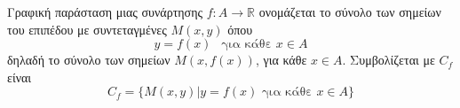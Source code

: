 Γραφική παράσταση μιας συνάρτησης $ f:A\rightarrow\mathbb{R} $ ονομάζεται το σύνολο των σημείων του επιπέδου με συντεταγμένες $ M(x,y) $ όπου \[ y=f(x)\ \ \text{ για κάθε }x\in A \]
δηλαδή το σύνολο των σημείων $ M(x,f(x)) $, για κάθε $ x\in A $. Συμβολίζεται με $ C_f $ είναι 
\[ C_f=\{M(x,y)|y=f(x)\textrm{ για κάθε }x\in A\} \]
